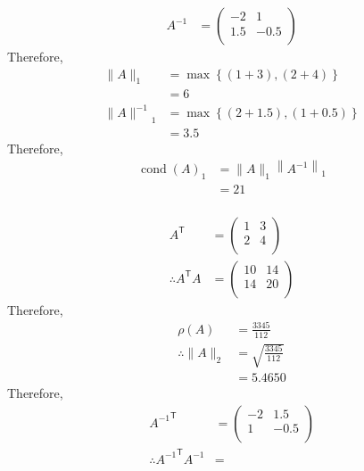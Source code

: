 \documentclass[fleqn, a4paper, 11pt, oneside]{amsart}
\theoremstyle{definition}
\theoremstyle{theorem}
\DeclareMathOperator{\cond}{cond}
\begin{document}
\begin{solution}
	\begin{align*}
		A^{-1} &=
			\begin{pmatrix}
				-2  & 1    \\
				1.5 & -0.5 \\
			\end{pmatrix}
	\end{align*}
	Therefore,
	\begin{align*}
		\|A\|_1        & = \max\left\{ (1 + 3) , (2 + 4) \right\}     \\
                               & = 6                                          \\
		{\|A\|^{-1}}_1 & = \max\left\{ (2 + 1.5) , (1 + 0.5) \right\} \\
                               & = 3.5
	\end{align*}
	Therefore,
	\begin{align*}
		\cond(A)_1 & = \|A\|_1 \left\| A^{-1} \right\|_1 \\
                           & = 21
	\end{align*}
	~\\
	\begin{align*}
		A^{\mathsf{T}} &= 
			\begin{pmatrix}
				1 & 3 \\
				2 & 4 \\
			\end{pmatrix}\\
		\therefore A^{\mathsf{T}} A &=
			\begin{pmatrix}
				10 & 14 \\
				14 & 20 \\
			\end{pmatrix}
	\end{align*}
	Therefore,
	\begin{align*}
		\rho(A)            & = \frac{3345}{112}        \\
		\therefore \|A\|_2 & = \sqrt{\frac{3345}{112}} \\
                                   & = 5.4650
	\end{align*}
	Therefore,
	\begin{align*}
		{A^{-1}}^{\mathsf{T}} &= 
			\begin{pmatrix}
				-2 & 1.5  \\
				1  & -0.5 \\
			\end{pmatrix}\\
		\therefore {A^{-1}}^{\mathsf{T}} A^{-1} &=

\end{align*}
\end{solution}
\end{document}
